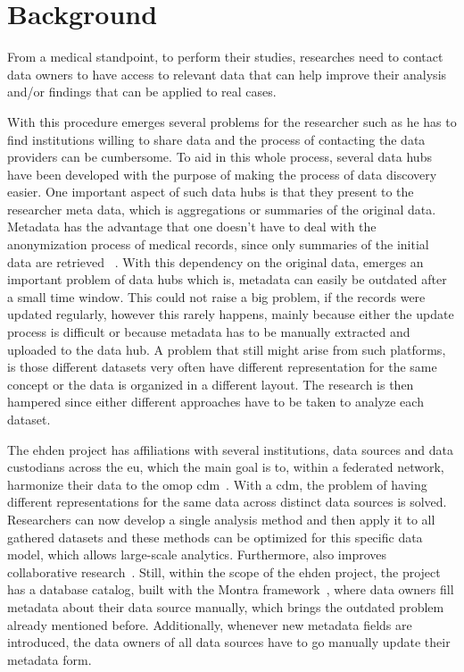 \chapter{Background}
\label{chapter:background}

From a medical standpoint, to perform their studies, researches need to contact data
owners to have access to relevant data that can help improve their analysis and/or
findings that can be applied to real cases.


With this procedure emerges several problems for the researcher such as he has to find
institutions willing to share data and the process of contacting the data providers can
be cumbersome.
To aid in this whole process, several data hubs have been developed with the purpose of
making the process of data discovery easier.
One important aspect of such data hubs is that they present to the researcher meta
data, which is aggregations or summaries of the original data.
Metadata has the advantage that one doesn't have to deal with the anonymization process
of medical records, since only summaries of the initial data are retrieved
~\cite{egenvar, montra}.
With this dependency on the original data, emerges an important problem of data hubs
which is, metadata can easily be outdated after a small time window.
This could not raise a big problem, if the records were updated regularly, however this
rarely happens, mainly because either the update process is difficult or because
metadata has to be manually extracted and uploaded to the data hub.
A problem that still might arise from such platforms, is those different datasets very
often have different representation for the same concept or the data is organized in a
different layout.
The research is then hampered since either different approaches have to be taken to
analyze each dataset.


The \gls{ehden} project has affiliations with several institutions, data sources and
data custodians across the \gls{eu}, which the main goal is to, within a federated
network, harmonize their data to the \gls{omop} \gls{cdm}~\cite{ehden-datapartners}.
With a \gls{cdm}, the problem of having different representations for the same data
across distinct data sources is solved.
Researchers can now develop a single analysis method and then apply it to all gathered
datasets and these methods can be optimized for this specific data model, which allows
large-scale analytics.
Furthermore, also improves collaborative research~\cite{ohdsi-site}.
Still, within the scope of the \gls{ehden} project, the project has a database catalog,
built with the Montra framework~\cite{montra}, where data owners fill metadata about
their data source manually, which brings the outdated problem already mentioned before.
Additionally, whenever new metadata fields are introduced, the data owners of all data
sources have to go manually update their metadata form.

